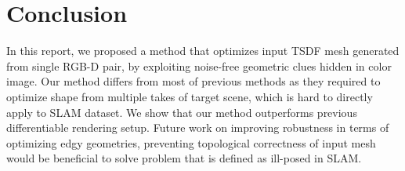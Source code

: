 \section{Conclusion}
In this report, we proposed a method that optimizes input TSDF mesh generated from single RGB-D pair, by exploiting noise-free geometric clues hidden in color image. 
Our method differs from most of previous methods as they required to optimize shape from multiple takes of target scene, which is hard to directly apply to SLAM dataset. 
We show that our method outperforms previous differentiable rendering setup. 
Future work on improving robustness in terms of optimizing edgy geometries, preventing topological correctness of input mesh would be beneficial to solve problem that is defined as ill-posed in SLAM.